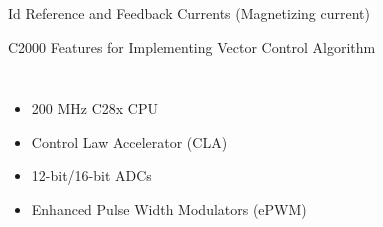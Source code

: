\begin{frame}{Id Reference and Feedback Currents (Magnetizing current)}
	\begin{figure}
		\centering


	\end{figure}
\end{frame}


\begin{frame}{C2000 Features for Implementing Vector Control Algorithm}
	\begin{columns}
		\begin{minipage}[c]{\linewidth}
			\centering
			\caption{F28379D Launchpad}
		\end{minipage}
		\begin{itemize}
			\item 200 MHz C28x CPU
			\item Control Law Accelerator (CLA)
			\item 12-bit/16-bit ADCs
			\item Enhanced Pulse Width Modulators (ePWM)
		\end{itemize}
	\end{columns}
\end{frame}

